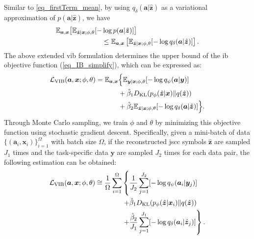 Similar to \cref{eq_firstTerm_mean}, by using $q_{\delta}(\bm{a}|\hat{\bm{z}})$ as a variational approximation of $p(\bm{a}|\hat{\bm{z}})$, we have
\begin{align}
    \mathbb{E}_{\bm{a},\bm{x}}\bigl[\mathbb{E}_{\hat{\bm{z}}|\bm{x};\phi,\theta}[-&\log p(\bm{a}|\hat{\bm{z}})]\bigr] \notag\\
    &\leq \mathbb{E}_{\bm{a},\bm{x}}\left[\mathbb{E}_{\hat{\bm{z}}|\bm{x};\phi,\theta}[-\log q_{\delta}(\bm{a}|\hat{\bm{z}})]\right].
\end{align} 
The above extended \gls{vib} formulation determines the upper bound of the \gls{ib} objective function (\cref{eq_IB_simplify}), which can be expressed as:
\begin{align}
\mathcal{L}_{\text{VIB}}(\bm{a}, \bm{x};\phi, \theta)= \mathbb{E}_{\bm{a},\bm{x}}&\Bigl\{
\mathbb{E}_{\bm{y}|\bm{x};\phi,\theta}[-\log q_{\psi}(\bm{a}|\bm{y})] \notag\\
&+\hat{\beta}_1 D_{\text{KL}}(p_{\phi}(\hat{\bm{z}} | \bm{x}) \| q(\hat{\bm{z}})) \notag\\
&+\hat{\beta}_2 \mathbb{E}_{\hat{\bm{z}}|\bm{x};\phi,\theta}[-\log q_{\delta}(\bm{a}|\hat{\bm{z}})]
\Bigr\}.
\label{eq_VIB_theory}
\end{align}
Through Monte Carlo sampling, we train \(\phi\) and \(\theta\) by minimizing this objective function using stochastic gradient descent.
Specifically, given a mini-batch of data $\{(\bm{a}_i,\bm{x}_i)\}^\Omega_{i=1}$ with batch size $\Omega$, if the reconstructed \gls{jscc} symbols $\hat{\bm{z}}$ are sampled $J_1$ times and the task-specific data $\bm{y}$ are sampled $J_2$ times for each data pair, the following estimation can be obtained:
\begin{align}
    \mathcal{L}_{\text{VIB}}(\bm{a}, \bm{x};\phi, \theta)\cong \frac{1}{\Omega}\sum_{i=1}^{\Omega} 
&\left\{
\frac{1}{J_2}\sum_{j=1}^{J_2}[-\log q_{\psi}(\bm{a}_{i}|\bm{y}_{j})] \right. \notag\\ 
&\left. +\hat{\beta}_1 D_{\text{KL}}(p_{\phi}(\hat{\bm{z}} | \bm{x}_{i}) \| q(\hat{\bm{z}})) \right. \notag\\
&\left. +\frac{\hat{\beta}_2}{J_1}\sum_{j=1}^{J_1}[-\log q_{\delta}(\bm{a}_{i}|\hat{\bm{z}}_{j})]
\right\}.
\label{eq_VIB_sampling}
\end{align}
